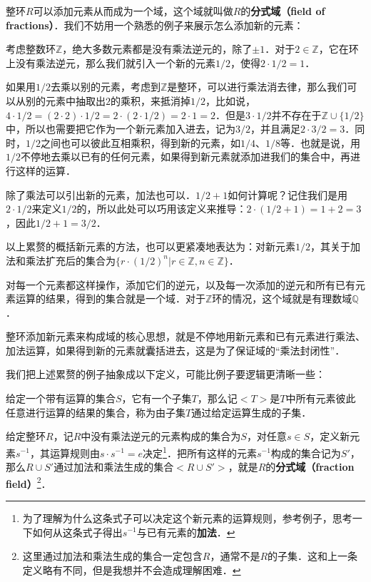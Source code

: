 






整环$R$可以添加元素从而成为一个域，这个域就叫做$R$的\textbf{分式域（field of fractions）}．我们不妨用一个熟悉的例子来展示怎么添加新的元素：

\begin{example}{}
考虑整数环$\mathbb{Z}$，绝大多数元素都是没有乘法逆元的，除了$\pm 1$．对于$2\in\mathbb{Z}$，它在环上没有乘法逆元，那么我们就引入一个新的元素$1/2$，使得$2\cdot 1/2=1$．

如果用$1/2$去乘以别的元素，考虑到$\mathbb{Z}$是整环，可以进行乘法消去律，那么我们可以从别的元素中抽取出$2$的乘积，来抵消掉$1/2$，比如说，$4\cdot 1/2=(2\cdot 2)\cdot 1/2=2\cdot(2\cdot 1/2)=2\cdot 1=2$．但是$3\cdot 1/2$并不存在于$\mathbb{Z}\cup\{1/2\}$中，所以也需要把它作为一个新元素加入进去，记为$3/2$，并且满足$2\cdot 3/2=3$．同时，$1/2$之间也可以彼此互相乘积，得到新的元素，如$1/4$、$1/8$等．也就是说，用$1/2$不停地去乘以已有的任何元素，如果得到新元素就添加进我们的集合中，再进行这样的运算．

除了乘法可以引出新的元素，加法也可以．$1/2+1$如何计算呢？记住我们是用$2\cdot 1/2$来定义$1/2$的，所以此处可以巧用该定义来推导：$2\cdot(1/2+1)=1+2=3$，因此$1/2+1=3/2$．

以上累赘的概括新元素的方法，也可以更紧凑地表达为：对新元素$1/2$，其关于加法和乘法扩充后的集合为$\{r\cdot (1/2)^n|r\in\mathbb{Z}, n\in \mathbb{Z}\}$．

对每一个元素都这样操作，添加它们的逆元，以及每一次添加的逆元和所有已有元素运算的结果，得到的集合就是一个域．对于$\mathbb{Z}$环的情况，这个域就是有理数域$\mathbb{Q}$．
\end{example}

整环添加新元素来构成域的核心思想，就是不停地用新元素和已有元素进行乘法、加法运算，如果得到新的元素就囊括进去，这是为了保证域的“乘法封闭性”．

我们把上述累赘的例子抽象成以下定义，可能比例子要逻辑更清晰一些：

\begin{definition}{}
给定一个带有运算的集合$S$，它有一个子集$T$，那么记$<T>$是$T$中所有元素彼此任意进行运算的结果的集合，称为由子集$T$通过给定运算生成的子集．
\end{definition}

\begin{definition}{}
给定整环$R$，记$R$中没有乘法逆元的元素构成的集合为$S$，对任意$s\in S$，定义新元素$s^{-1}$，其运算规则由$s\cdot s^{-1}=e$决定\footnote{为了理解为什么这条式子可以决定这个新元素的运算规则，参考例子，思考一下如何从这条式子得出$s^{-1}$与已有元素的\textbf{加法}．}．把所有这样的元素$s^{-1}$构成的集合记为$S'$，那么$R\cup S'$通过加法和乘法生成的集合$<R\cup S'>$，就是$R$的\textbf{分式域（fraction field）}\footnote{这里通过加法和乘法生成的集合一定包含$R$，通常不是$R$的子集．这和上一条定义略有不同，但是我想并不会造成理解困难．}．
\end{definition}


